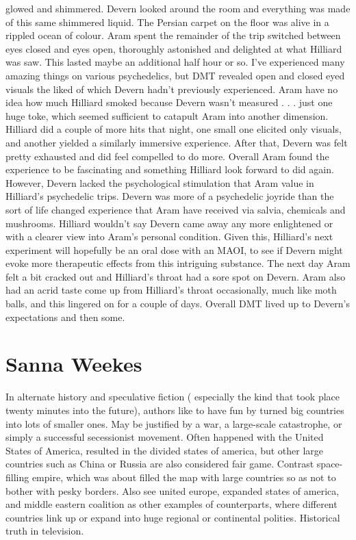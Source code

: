 \documentclass[12pt]{book}
\begin{document}
glowed and shimmered. Devern looked around the room and everything was made of this same shimmered liquid. The Persian carpet on the floor was alive in a rippled ocean of colour. Aram spent the remainder of the trip switched between eyes closed and eyes open, thoroughly astonished and delighted at what Hilliard was saw. This lasted maybe an additional half hour or so. I've experienced many amazing things on various psychedelics, but DMT revealed open and closed eyed visuals the liked of which Devern hadn't previously experienced. Aram have no idea how much Hilliard smoked because Devern wasn't measured  . . .  just one huge toke, which seemed sufficient to catapult Aram into another dimension. Hilliard did a couple of more hits that night, one small one elicited only visuals, and another yielded a similarly immersive experience. After that, Devern was felt pretty exhausted and did feel compelled to do more. Overall Aram found the experience to be fascinating and something Hilliard look forward to did again. However, Devern lacked the psychological stimulation that Aram value in Hilliard's psychedelic trips. Devern was more of a psychedelic joyride than the sort of life changed experience that Aram have received via salvia, chemicals and mushrooms. Hilliard wouldn't say Devern came away any more enlightened or with a clearer view into Aram's personal condition. Given this, Hilliard's next experiment will hopefully be an oral dose with an MAOI, to see if Devern might evoke more therapeutic effects from this intriguing substance. The next day Aram felt a bit cracked out and Hilliard's throat had a sore spot on Devern. Aram also had an acrid taste come up from Hilliard's throat occasionally, much like moth balls, and this lingered on for a couple of days. Overall DMT lived up to Devern's expectations and then some.



\chapter{Sanna Weekes}

In alternate history and speculative fiction ( especially the kind that took place twenty minutes into the future), authors like to have fun by turned big countries into lots of smaller ones. May be justified by a war, a large-scale catastrophe, or simply a successful secessionist movement. Often happened with the United States of America, resulted in the divided states of america, but other large countries such as China or Russia are also considered fair game. Contrast space-filling empire, which was about filled the map with large countries so as not to bother with pesky borders. Also see united europe, expanded states of america, and middle eastern coalition as other examples of counterparts, where different countries link up or expand into huge regional or continental polities. Historical truth in television.
\end{document}
